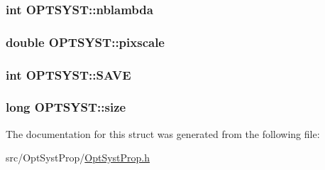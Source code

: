 \hypertarget{structOPTSYST_a984f1bc6e335c6ca935a7a4abc960351}{
\subsubsection[{nblambda}]{\setlength{\rightskip}{0pt plus 5cm}int O\+P\+T\+S\+Y\+S\+T\+::nblambda}}\label{structOPTSYST_a984f1bc6e335c6ca935a7a4abc960351}
\hypertarget{structOPTSYST_aa64373d953735e7fc898f664706ae434}{
\subsubsection[{pixscale}]{\setlength{\rightskip}{0pt plus 5cm}double O\+P\+T\+S\+Y\+S\+T\+::pixscale}}\label{structOPTSYST_aa64373d953735e7fc898f664706ae434}
\hypertarget{structOPTSYST_a1edeacc3267a9dae94f74a7ae2d5d668}{
\subsubsection[{S\+A\+V\+E}]{\setlength{\rightskip}{0pt plus 5cm}int O\+P\+T\+S\+Y\+S\+T\+::\+S\+A\+V\+E}}\label{structOPTSYST_a1edeacc3267a9dae94f74a7ae2d5d668}
\hypertarget{structOPTSYST_a1ca7a42369dc6bf1567dbeb3028c8a2a}{
\subsubsection[{size}]{\setlength{\rightskip}{0pt plus 5cm}long O\+P\+T\+S\+Y\+S\+T\+::size}}\label{structOPTSYST_a1ca7a42369dc6bf1567dbeb3028c8a2a}


The documentation for this struct was generated from the following file\+:\begin{DoxyCompactItemize}
\item 
src/\+Opt\+Syst\+Prop/\hyperlink{OptSystProp_8h}{Opt\+Syst\+Prop.\+h}\end{DoxyCompactItemize}
